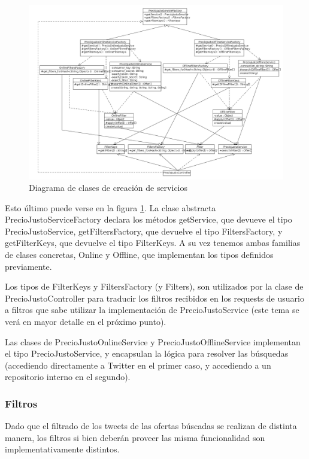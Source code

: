 \begin{figure}[h]
\centerline{\includegraphics[width=0.44\paperwidth]{./imgs/class_diagram_service_factory_v2.png}}
\caption{Diagrama de clases de creaci\'on de servicios}
\label{fig:class_service_factory} 
\end{figure}

Esto \'ultimo puede verse en la figura \ref{fig:class_service_factory}. La clase abstracta PrecioJustoServiceFactory declara los m\'etodos getService, que devueve el tipo PrecioJustoService, getFiltersFactory, que devuelve el tipo FiltersFactory, y getFilterKeys, que devuelve el tipo FilterKeys. A su vez tenemos ambas familias de clases concretas, Online y Offline, que implementan los tipos definidos  previamente.

Los tipos de FilterKeys y FiltersFactory (y Filters), son utilizados por la clase de PrecioJustoController para traducir los filtros recibidos en los requests de usuario a filtros que sabe utilizar la implementaci\'on de PrecioJustoService (este tema se ver\'a en mayor detalle en el pr\'oximo punto).

Las clases de PrecioJustoOnlineService y PrecioJustoOfflineService implementan el tipo PrecioJustoService, y encapsulan la l\'ogica para resolver las b\'usquedas (accediendo directamente a Twitter en el primer caso, y accediendo a un repositorio interno en el segundo).


\subsubsection{Filtros}

Dado que el filtrado de los tweets de las ofertas b\'uscadas se realizan de distinta manera, los filtros si bien deber\'an proveer las misma funcionalidad son implementativamente distintos.

